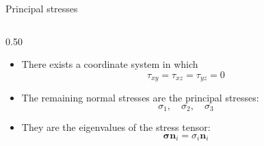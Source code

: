 \documentclass[aspectratio=169]{beamer}
\begin{document}
\begin{frame}{Principal stresses}
\begin{columns}[T]
\begin{column}{0.50\textwidth}
      \begin{itemize}
        \item \small There exists a coordinate system in which
              \[
                \tau_{xy}=\tau_{xz}=\tau_{yz}=0
              \]

        \item \small The remaining normal stresses are the
              principal stresses:
              \[
                \sigma_1,\quad\sigma_2,\quad\sigma_3
              \]

        \item \small They are the eigenvalues of the stress tensor:
              \[
                \boldsymbol{\sigma}\mathbf n_i
                =
                \sigma_i\mathbf n_i
              \]
      \end{itemize}
    \end{column}
  \end{columns}
\end{frame}
\end{document}

